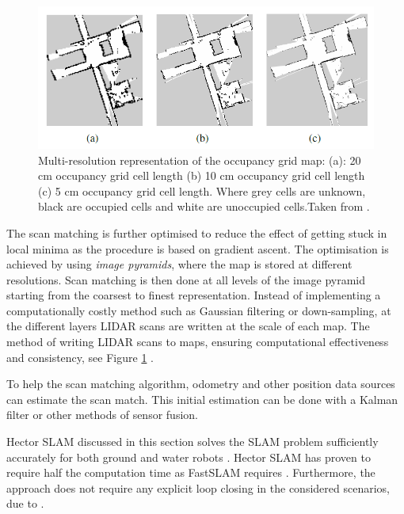 \begin{figure}[H]
	\centering
	\includegraphics[width=0.7\linewidth]{figs/hectorSLAM_multiresolution}
	\caption[Hector SLAM multi-resolution representation]{Multi-resolution representation of the occupancy grid map: (a): 20 cm occupancy grid cell length (b) 10 cm occupancy grid cell length (c) 5 cm occupancy grid cell length. Where grey cells are unknown, black are occupied cells and white are unoccupied cells.Taken from \cite{Kohlbrecher2011a}.}
	\label{fig:hectorslammultiresolution}
\end{figure}

The scan matching is further optimised to reduce the effect of getting stuck in local minima as the procedure is based on gradient ascent. The optimisation is achieved by using \textit{image pyramids}, where the map is stored at different resolutions. Scan matching is then done at all levels of the image pyramid starting from the coarsest to finest representation. Instead of implementing a computationally costly method such as Gaussian filtering or down-sampling, at the different layers LIDAR scans are written at the scale of each map. The method of writing LIDAR scans to maps, ensuring computational effectiveness and consistency, see Figure \ref{fig:hectorslammultiresolution} \cite{Habbecke2006IterativeM}.

To help the scan matching algorithm, odometry and other position data sources can estimate the scan match. This initial estimation can be done with a Kalman filter or other methods of sensor fusion.

Hector SLAM discussed in this section solves the SLAM problem sufficiently accurately for both ground and water robots \cite{Kohlbrecher2011a}. Hector SLAM has proven to require half the computation time as FastSLAM requires \cite{Eliwa2017}. Furthermore, the approach does not require any explicit loop closing in the considered scenarios, due to  \cite{Kohlbrecher2011a}.  

